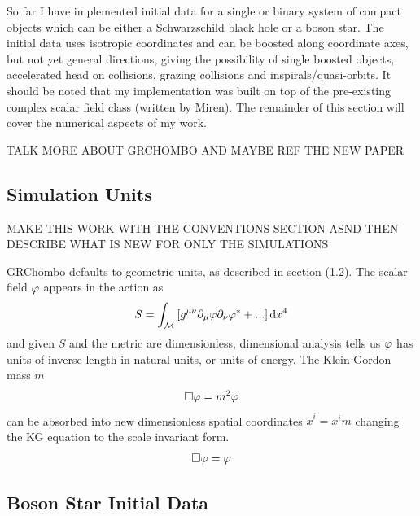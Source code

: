 So far I have implemented initial data for a single or binary system of compact objects which can be either a Schwarzschild black hole or a boson star. The initial data uses isotropic coordinates and can be boosted along coordinate axes, but not yet general directions, giving the possibility of single boosted objects, accelerated head on collisions, grazing collisions and inspirals/quasi-orbits. It should be noted that my implementation was built on top of the pre-existing complex scalar field class (written by Miren). The remainder of this section will cover the numerical aspects of my work.

TALK MORE ABOUT GRCHOMBO AND MAYBE REF THE NEW PAPER


\subsection{Simulation Units}
MAKE THIS WORK WITH THE CONVENTIONS SECTION ASND THEN DESCRIBE WHAT IS NEW FOR ONLY THE SIMULATIONS

GRChombo defaults to geometric units, as described in section (1.2). The scalar field $\varphi$ appears in the action as
\begin{equation} S = \int_{\mathcal{M}} \left[g^{\mu\nu}\partial_\mu \varphi \partial_\nu \varphi^* + ... \right]\dd x^4\end{equation}
and given $S$ and the metric are dimensionless, dimensional analysis tells us $\varphi$ has units of inverse length in natural units, or units of energy. The Klein-Gordon mass $m$
\begin{equation} \Box \varphi = m^2 \varphi\end{equation}
can be absorbed into new dimensionless spatial coordinates $\tilde{x}^i = x^i m$ changing the KG equation to the scale invariant form.
\begin{equation} \Box \varphi = \varphi\end{equation}




\subsection{Boson Star Initial Data}

